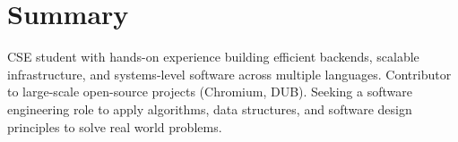 \section{Summary}
CSE student with hands-on experience building efficient backends, scalable infrastructure, and systems-level software across multiple languages. Contributor to large-scale open-source projects (Chromium, DUB). Seeking a software engineering role to apply algorithms, data structures, and software design principles to solve real world problems.
